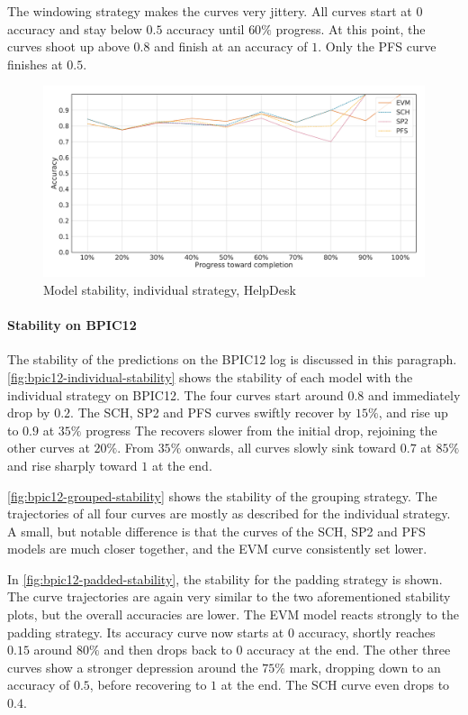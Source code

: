 The windowing strategy makes the curves very jittery.
All curves start at 0 accuracy and stay below $0.5$ accuracy until $60\%$ progress.
At this point, the curves shoot up above $0.8$ and finish at an accuracy of $1$.
Only the PFS curve finishes at $0.5$.

\begin{figure}[!htb]
    \centering
    \includegraphics[width=\textwidth]{gfx/helpdesk/individual_stability.pdf}
    \caption{Model stability, individual strategy, HelpDesk}
    \label{fig:helpdesk-individual-stability}
\end{figure}
\FloatBarrier

\paragraph{Stability on BPIC12}
The stability of the predictions on the BPIC12 log is discussed in this paragraph.
\autoref{fig:bpic12-individual-stability} shows the stability of each model with the individual strategy on BPIC12.
The four curves start around $0.8$ and immediately drop by $0.2$.
The SCH, SP2 and PFS curves swiftly recover by $15\%$, and rise up to $0.9$ at $35\%$ progress
The recovers slower from the initial drop, rejoining the other curves at $20\%$.
From $35\%$ onwards, all curves slowly sink toward $0.7$ at $85\%$ and rise sharply toward $1$ at the end.

\autoref{fig:bpic12-grouped-stability} shows the stability of the grouping strategy.
The trajectories of all four curves are mostly as described for the individual strategy.
A small, but notable difference is that the curves of the SCH, SP2 and PFS models are much closer together, and the EVM curve consistently set lower.

In \autoref{fig:bpic12-padded-stability}, the stability for the padding strategy is shown.
The curve trajectories are again very similar to the two aforementioned stability plots, but the overall accuracies are lower.
The EVM model reacts strongly to the padding strategy.
Its accuracy curve now starts at $0$ accuracy, shortly reaches $0.15$ around $80\%$ and then drops back to $0$ accuracy at the end.
The other three curves show a stronger depression around the $75\%$ mark, dropping down to an accuracy of $0.5$, before recovering to $1$ at the end.
The SCH curve even drops to $0.4$.

